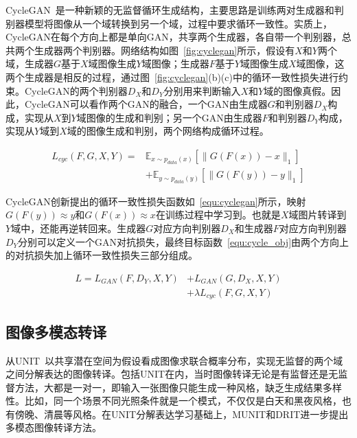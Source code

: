 CycleGAN~\cite{zhu2017unpaired}是一种新颖的无监督循环生成结构，主要思路是训练两对生成器和判别器模型将图像从一个域转换到另一个域，过程中要求循环一致性。实质上，CycleGAN在每个方向上都是单向GAN，共享两个生成器，各自带一个判别器，总共两个生成器两个判别器。网络结构如图~\ref{fig:cyclegan}所示，假设有$X$和$Y$两个域，生成器$G$基于$X$域图像生成$Y$域图像；生成器$F$基于$Y$域图像生成$X$域图像，这两个生成器是相反的过程，通过图~\ref{fig:cyclegan}(b)(c)中的循环一致性损失进行约束。CycleGAN的两个判别器$D_X$和$D_Y$分别用来判断输入$X$和$Y$域的图像真假。因此，CycleGAN可以看作两个GAN的融合，一个GAN由生成器$G$和判别器$D_X$构成，实现从$X$到$Y$域图像的生成和判别；另一个GAN由生成器$F$和判别器$D_Y$构成，实现从$Y$域到$X$域的图像生成和判别，两个网络构成循环过程。

\begin{equation}
\label{equ:cyclegan}
\begin{aligned}
L_{cyc}(F,G,X,Y)= & \mathbb{E}_{x \sim p_{data}(x)}[\parallel G(F(x))-x \parallel_1]\\
& + \mathbb{E}_{y \sim p_{data}(y)}[\parallel G(F(y))-y \parallel_1]
\end{aligned}
\end{equation}

CycleGAN创新提出的循环一致性损失函数如~\ref{equ:cyclegan}所示，映射$ G(F(y)) \approx y$和$ G(F(x)) \approx x$在训练过程中学习到。也就是$X$域图片转译到$Y$域中，还能再逆转回来。生成器$G$对应方向判别器$D_X$和生成器$F$对应方向判别器$D_Y$分别可以定义一个GAN对抗损失，最终目标函数~\ref{equ:cycle_obj}由两个方向上的对抗损失加上循环一致性损失三部分组成。    

\begin{equation}
\label{equ:cycle_obj}
\begin{aligned}
L=L_{GAN}(F,D_Y,X,Y)&+L_{GAN}(G,D_X,X,Y)\\
& + \lambda L_{cyc}(F,G,X,Y)
\end{aligned}
\end{equation}


\subsection{图像多模态转译}
从UNIT~\cite{liu2017unsupervised}以共享潜在空间为假设看成图像求联合概率分布，实现无监督的两个域之间分解表达的图像转译。包括UNIT在内，当时图像转译无论是有监督还是无监督方法，大都是一对一，即输入一张图像只能生成一种风格，缺乏生成结果多样性。比如，同一个场景不同光照条件就是一个模式，不仅仅是白天和黑夜风格，也有傍晚、清晨等风格。在UNIT分解表达学习基础上，MUNIT和DRIT进一步提出多模态图像转译方法。

